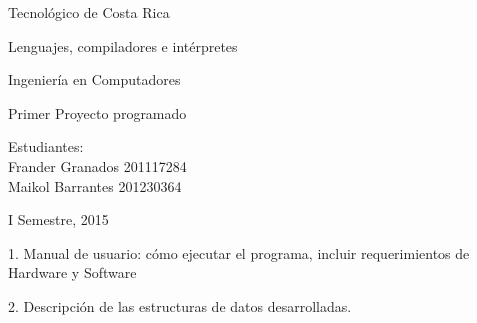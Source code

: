 \documentclass[12pt,a4paper]{report}
\begin{document}
\begin{center}
{\LARGE Tecnol\'{o}gico de Costa Rica \\[2 cm]}

{\Large Lenguajes, compiladores e intérpretes \\[3 cm]}

{\Large Ingenier\'{i}a en Computadores \\[3 cm]}

{\Large Primer Proyecto programado \\[3 cm]}

{\large Estudiantes: \\[0.3 cm] }
{\Large Frander Granados 201117284 \\}
{\Large Maikol Barrantes 201230364\\[3 cm]}

{\Large I Semestre, 2015 \\[2 cm] }
\end{center}


\newpage

\begin{flushleft}

1. Manual de usuario: cómo ejecutar el programa, incluir requerimientos de
Hardware y Software

\end{flushleft}

\begin{flushleft}

2. Descripción de las estructuras de datos desarrolladas.

\end{flushleft}
\end{document}
